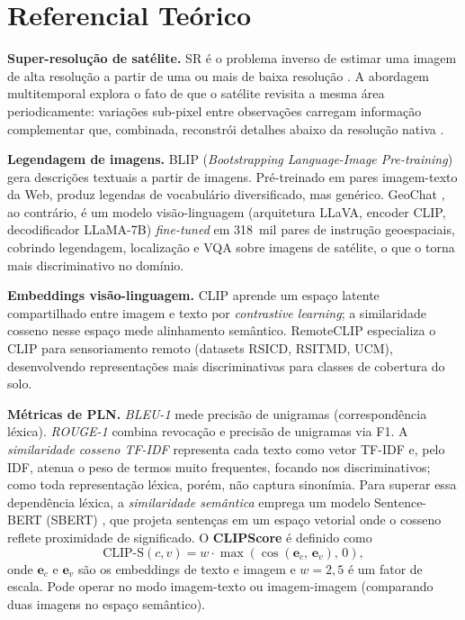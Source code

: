 \documentclass[12pt]{article}
\begin{document}
\section{Referencial Teórico}

\textbf{Super-resolução de satélite.} SR é o problema inverso de estimar
uma imagem de alta resolução a partir de uma ou mais de baixa resolução
\cite{dong:2016}. A abordagem multitemporal explora o fato de que o
satélite revisita a mesma área periodicamente: variações sub-pixel entre
observações carregam informação complementar que, combinada, reconstrói
detalhes abaixo da resolução nativa \cite{nguyen:2021}.

\textbf{Legendagem de imagens.} BLIP (\textit{Bootstrapping
Language-Image Pre-training}) \cite{li:2022} gera descrições textuais a
partir de imagens. Pré-treinado em pares imagem-texto da Web, produz
legendas de vocabulário diversificado, mas genérico. GeoChat
\cite{kuckreja:2024}, ao contrário, é um modelo visão-linguagem
(arquitetura LLaVA, encoder CLIP, decodificador LLaMA-7B) \textit{fine-tuned}
em 318~mil pares de instrução geoespaciais, cobrindo legendagem,
localização e VQA sobre imagens de satélite, o que o torna mais
discriminativo no domínio.

\textbf{Embeddings visão-linguagem.} CLIP \cite{radford:2021} aprende um
espaço latente compartilhado entre imagem e texto por \textit{contrastive
learning}; a similaridade cosseno nesse espaço mede alinhamento
semântico. RemoteCLIP \cite{liu:2024} especializa o CLIP para
sensoriamento remoto (datasets RSICD, RSITMD, UCM), desenvolvendo
representações mais discriminativas para classes de cobertura do solo.

\textbf{Métricas de PLN.} \textit{BLEU-1} \cite{papineni:2002} mede
precisão de unigramas (correspondência léxica). \textit{ROUGE-1}
\cite{lin:2004} combina revocação e precisão de unigramas via F1.
A \textit{similaridade cosseno TF-IDF} representa cada texto como vetor
TF-IDF e, pelo IDF, atenua o peso de termos muito frequentes, focando
nos discriminativos; como toda representação léxica, porém, não captura
sinonímia. Para superar essa dependência léxica, a \textit{similaridade
semântica} emprega um modelo Sentence-BERT (SBERT) \cite{reimers:2019},
que projeta sentenças em um espaço vetorial onde o cosseno reflete
proximidade de significado. O \textbf{CLIPScore}
\cite{hessel:2021} é definido como
\begin{equation}
  \text{CLIP-S}(c, v) = w \cdot \max\!\left(\cos\!\left(\mathbf{e}_c,\, \mathbf{e}_v\right),\, 0\right),
\end{equation}
onde $\mathbf{e}_c$ e $\mathbf{e}_v$ são os embeddings de texto e imagem
e $w=2{,}5$ é um fator de escala. Pode operar no modo imagem-texto ou
imagem-imagem (comparando duas imagens no espaço semântico).
\end{document}
